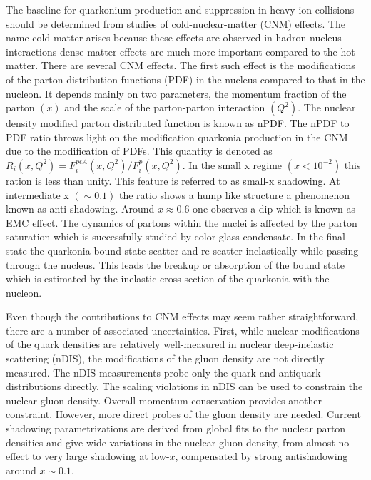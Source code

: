 The baseline for quarkonium production and suppression in heavy-ion collisions 
should be determined from studies of
cold-nuclear-matter (CNM) effects. The name cold matter 
arises because these effects are observed in hadron-nucleus interactions 
dense matter effects are much more important compared to the hot matter.  There are several 
CNM effects. The first such effect is the modifications of the parton 
distribution functions (PDF) in the nucleus compared to that in the nucleon. It depends mainly on two parameters, 
the momentum fraction of the parton $(x)$ and the scale of the parton-parton 
interaction $(Q^2)$. The nuclear density modified parton distributed function is known 
as nPDF. The nPDF to PDF ratio throws light on the modification quarkonia production 
in the CNM due to the modification of PDFs. This quantity is denoted as $R_i(x,Q^2)=F_i^{p \epsilon A} (x, Q^2) /
F_i^p  (x, Q^2)$. In the small x regime $(x < 10^{-2})$ this ration is less than unity. This feature is referred to as 
small-x shadowing. At intermediate x $(\sim 0.1)$ the ratio shows a hump like structure a phenomenon known as 
anti-shadowing. Around $x\approx 0.6$ one observes a dip which is known as EMC effect. The dynamics of partons 
within the nuclei is affected by the parton saturation which is successfully studied by color glass condensate. In the 
final state the quarkonia bound state scatter and re-scatter inelastically while passing through the nucleus. This leads 
the breakup or absorption of the bound state which is estimated by the inelastic cross-section of the quarkonia with 
the nucleon. 

Even though the contributions to CNM effects may 
seem rather straightforward, there are a number of associated uncertainties. 
First, while nuclear modifications of the quark densities are relatively 
well-measured in nuclear deep-inelastic scattering (nDIS), the modifications of the 
gluon density are not directly measured. The nDIS measurements probe only the 
quark and antiquark distributions directly. The scaling violations in nDIS can 
be used to constrain the nuclear gluon density. Overall momentum conservation 
provides another constraint. However, more direct probes of the gluon 
density are needed. Current shadowing parametrizations are derived from 
global fits to the nuclear parton densities and
give wide variations in the nuclear gluon 
density, from almost no effect to very large shadowing at low-$x$, 
compensated 
by strong antishadowing around $x \sim 0.1$.  


